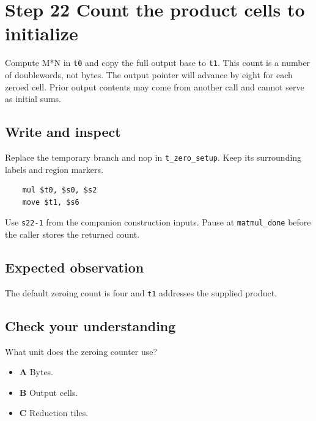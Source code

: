 \section{Step 22 Count the product cells to initialize}\label{matmul-s22}

Compute M*N in \texttt{t0} and copy the full output base to \texttt{t1}. This count is a number of doublewords, not bytes. The output pointer will advance by eight for each zeroed cell. Prior output contents may come from another call and cannot serve as initial sums.

\subsection{Write and inspect}
Replace the temporary branch and nop in \texttt{t\_zero\_setup}. Keep its surrounding labels and region markers.

\begin{verbatim}
    mul $t0, $s0, $s2
    move $t1, $s6
\end{verbatim}
Use \texttt{s22-1} from the companion construction inputs. Pause at \texttt{matmul\_done} before the caller stores the returned count.

\subsection{Expected observation}
The default zeroing count is four and \texttt{t1} addresses the supplied product.

\subsection{Check your understanding}
What unit does the zeroing counter use?

\begin{itemize}
\item \textbf{A} Bytes.
\item \textbf{B} Output cells.
\item \textbf{C} Reduction tiles.
\end{itemize}
